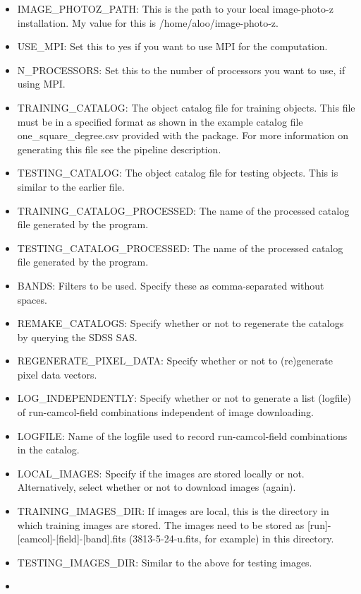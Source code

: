 \documentclass{article}
\begin{document}
\begin{itemize}
\item
  IMAGE\_PHOTOZ\_PATH: This is the path to your local image-photo-z
  installation. My value for this is /home/aloo/image-photo-z.
\item
  USE\_MPI: Set this to yes if you want to use MPI for the computation.
\item
  N\_PROCESSORS: Set this to the number of processors you want to use,
  if using MPI.
\item
  TRAINING\_CATALOG: The object catalog file for training objects. This
  file must be in a specified format as shown in the example catalog
  file one\_square\_degree.csv provided with the package. For more
  information on generating this file see the pipeline description.
\item
  TESTING\_CATALOG: The object catalog file for testing objects. This is
  similar to the earlier file.
\item
  TRAINING\_CATALOG\_PROCESSED: The name of the processed catalog file
  generated by the program.
\item
  TESTING\_CATALOG\_PROCESSED: The name of the processed catalog file
  generated by the program.
\item
  BANDS: Filters to be used. Specify these as comma-separated without
  spaces.
\item
  REMAKE\_CATALOGS: Specify whether or not to regenerate the catalogs by
  querying the SDSS SAS.
\item
  REGENERATE\_PIXEL\_DATA: Specify whether or not to (re)generate pixel
  data vectors.
\item
  LOG\_INDEPENDENTLY: Specify whether or not to generate a list
  (logfile) of run-camcol-field combinations independent of image
  downloading.
\item
  LOGFILE: Name of the logfile used to record run-camcol-field
  combinations in the catalog.
\item
  LOCAL\_IMAGES: Specify if the images are stored locally or not.
  Alternatively, select whether or not to download images (again).
\item
  TRAINING\_IMAGES\_DIR: If images are local, this is the directory in
  which training images are stored. The images need to be stored as
  {[}run{]}-{[}camcol{]}-{[}field{]}-{[}band{]}.fits (3813-5-24-u.fits,
  for example) in this directory.
\item
  TESTING\_IMAGES\_DIR: Similar to the above for testing images.
\item

\end{itemize}
\end{document}
